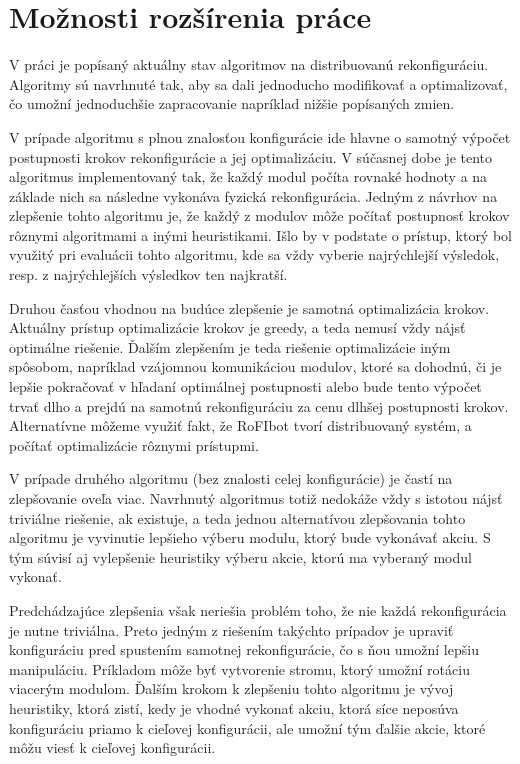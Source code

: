 \documentclass[
  digital, %
  oneside, %
  notable,   %
  lof,     %
  nolot,     %
]{fithesis3}
\begin{document}
\section{Možnosti rozšírenia práce}
\label{sec:future}
V práci je popísaný aktuálny stav algoritmov na distribuovanú rekonfiguráciu. Algoritmy sú navrhnuté tak, aby sa dali jednoducho modifikovať a optimalizovať, čo umožní jednoduchšie zapracovanie napríklad nižšie popísaných zmien. 

V prípade algoritmu s plnou znalosťou konfigurácie ide hlavne o samotný výpočet postupnosti krokov rekonfigurácie a jej optimalizáciu. V súčasnej dobe je tento algoritmus implementovaný tak, že každý modul počíta rovnaké hodnoty a na základe nich sa následne vykonáva fyzická rekonfigurácia. Jedným z návrhov na zlepšenie tohto algoritmu je, že každý z modulov môže počítať postupnosť krokov rôznymi algoritmami a inými heuristikami. Išlo by v podstate o prístup, ktorý bol využitý pri evaluácii tohto algoritmu, kde sa vždy vyberie najrýchlejší výsledok, resp. z najrýchlejších výsledkov ten najkratší. 

Druhou časťou vhodnou na budúce zlepšenie je samotná optimalizácia krokov. Aktuálny prístup optimalizácie krokov je greedy, a teda nemusí vždy nájsť optimálne riešenie. Ďalším zlepšením je teda riešenie optimalizácie iným spôsobom, napríklad vzájomnou komunikáciou modulov, ktoré sa dohodnú, či je lepšie pokračovať v hľadaní optimálnej postupnosti alebo bude tento výpočet trvať dlho a prejdú na samotnú rekonfiguráciu za cenu dlhšej postupnosti krokov. Alternatívne môžeme využiť fakt, že RoFIbot tvorí distribuovaný systém, a počítať optimalizácie rôznymi prístupmi. 

V prípade druhého algoritmu (bez znalosti celej konfigurácie) je častí na zlepšovanie oveľa viac. Navrhnutý algoritmus totiž nedokáže vždy s istotou nájsť triviálne riešenie, ak existuje, a teda jednou alternatívou zlepšovania tohto algoritmu je vyvinutie lepšieho výberu modulu, ktorý bude vykonávať akciu. S tým súvisí aj vylepšenie heuristiky výberu akcie, ktorú ma vyberaný modul vykonať. 

Predchádzajúce zlepšenia však neriešia problém toho, že nie každá rekonfigurácia je nutne triviálna. Preto jedným z riešením takýchto prípadov je upraviť konfiguráciu pred spustením samotnej rekonfigurácie, čo s ňou umožní lepšiu manipuláciu. Príkladom môže byť vytvorenie stromu, ktorý umožní rotáciu viacerým modulom. Ďalším krokom k zlepšeniu tohto algoritmu je vývoj heuristiky, ktorá zistí, kedy je vhodné vykonať akciu, ktorá síce neposúva konfiguráciu priamo k cieľovej konfigurácii, ale umožní tým ďalšie akcie, ktoré môžu viesť k cieľovej konfigurácii. 
\end{document}
